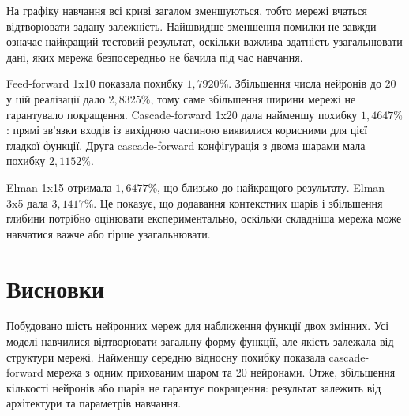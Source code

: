 \documentclass[12pt,a4paper]{article}
\begin{document}
На графіку навчання всі криві загалом зменшуються, тобто мережі вчаться відтворювати задану залежність. Найшвидше зменшення помилки не завжди означає найкращий тестовий результат, оскільки важлива здатність узагальнювати дані, яких мережа безпосередньо не бачила під час навчання.

Feed-forward 1x10 показала похибку $1{,}7920\%$. Збільшення числа нейронів до 20 у цій реалізації дало $2{,}8325\%$, тому саме збільшення ширини мережі не гарантувало покращення. Cascade-forward 1x20 дала найменшу похибку $1{,}4647\%$: прямі зв'язки входів із вихідною частиною виявилися корисними для цієї гладкої функції. Друга cascade-forward конфігурація з двома шарами мала похибку $2{,}1152\%$.

Elman 1x15 отримала $1{,}6477\%$, що близько до найкращого результату. Elman 3x5 дала $3{,}1417\%$. Це показує, що додавання контекстних шарів і збільшення глибини потрібно оцінювати експериментально, оскільки складніша мережа може навчатися важче або гірше узагальнювати.

\section{Висновки}
Побудовано шість нейронних мереж для наближення функції двох змінних. Усі моделі навчилися відтворювати загальну форму функції, але якість залежала від структури мережі. Найменшу середню відносну похибку показала cascade-forward мережа з одним прихованим шаром та 20 нейронами. Отже, збільшення кількості нейронів або шарів не гарантує покращення: результат залежить від архітектури та параметрів навчання.
\end{document}
